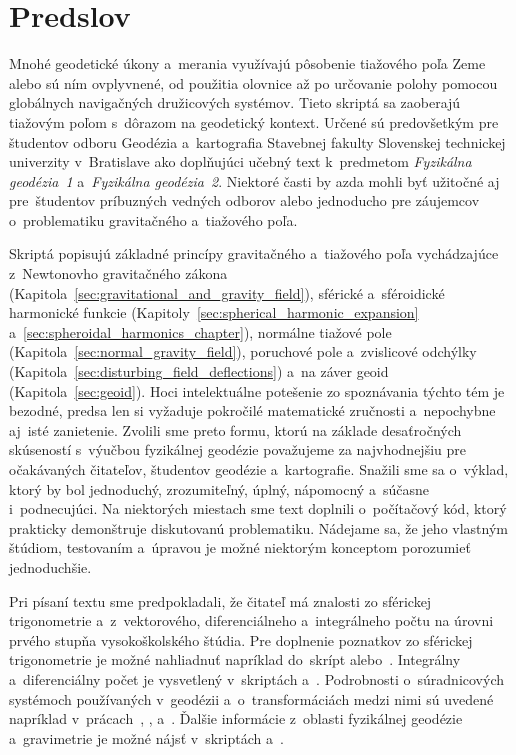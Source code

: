 \documentclass[a4paper, 12pt]{book}
\begin{document}

\chapter*{Predslov}

Mnohé geodetické úkony a~merania využívajú pôsobenie tiažového poľa Zeme alebo 
sú ním ovplyvnené, od použitia olovnice až po určovanie polohy pomocou 
globálnych navigačných družicových systémov.  Tieto skriptá sa zaoberajú 
tiažovým poľom s~dôrazom na geodetický kontext.  Určené sú predovšetkým pre 
študentov odboru Geodézia a~kartografia Stavebnej fakulty Slovenskej technickej 
univerzity v~Bratislave ako doplňujúci učebný text k~predmetom \emph{Fyzikálna 
geodézia~1} a~\emph{Fyzikálna geodézia~2}.  Niektoré časti by azda mohli byť 
užitočné aj pre~študentov príbuzných vedných odborov alebo jednoducho pre 
záujemcov o~problematiku gravitačného a~tiažového poľa.

Skriptá popisujú základné princípy gravitačného a~tiažového poľa vychádzajúce 
z~Newtonovho gravitačného zákona 
(Kapitola~\ref{sec:gravitational_and_gravity_field}), sférické a~sféroidické 
harmonické funkcie (Kapitoly~\ref{sec:spherical_harmonic_expansion} 
a~\ref{sec:spheroidal_harmonics_chapter}), normálne tiažové pole 
(Kapitola~\ref{sec:normal_gravity_field}), poruchové pole a~zvislicové odchýlky 
(Kapitola~\ref{sec:disturbing_field_deflections}) a~na záver geoid 
(Kapitola~\ref{sec:geoid}).  Hoci intelektuálne potešenie zo spoznávania týchto 
tém je bezodné, predsa len si vyžaduje pokročilé matematické zručnosti 
a~nepochybne aj~isté zanietenie.  Zvolili sme preto formu, ktorú na základe 
desaťročných skúseností s~výučbou fyzikálnej geodézie považujeme za 
najvhodnejšiu pre očakávaných čitateľov, študentov geodézie a~kartografie.  
Snažili sme sa o~výklad, ktorý by bol jednoduchý, zrozumiteľný, úplný, 
nápomocný a~súčasne i~podnecujúci.  Na niektorých miestach sme text doplnili 
o~počítačový kód, ktorý prakticky demonštruje diskutovanú problematiku.  
Nádejame sa, že jeho vlastným štúdiom, testovaním a~úpravou je možné niektorým 
konceptom porozumieť jednoduchšie.

Pri písaní textu sme predpokladali, že čitateľ má znalosti zo sférickej 
trigonometrie a~z~vektorového, diferenciálneho a~integrálneho počtu na úrovni 
prvého stupňa vysokoškolského štúdia.  Pre doplnenie poznatkov zo sférickej 
trigonometrie je možné nahliadnuť napríklad do~skrípt \textcite{Husar2017} 
alebo~\textcite{Minarechova2019}.  Integrálny a~diferenciálny počet je 
vysvetlený v~skriptách \textcite{Minarechova2019} a~\textcite{Macak2021}.  
Podrobnosti o~súradnicových systémoch používaných v~geodézii 
a~o~transformáciách medzi nimi sú uvedené napríklad 
v~prácach~\textcite{Melicher1993}, \textcite{Kostelecky2008}, 
\textcite{Melicher2009} a~\textcite{Husar2017}.  Ďalšie informácie z~oblasti 
fyzikálnej geodézie a~gravimetrie je možné nájsť v~skriptách 
\textcite{Janak2006} a~\textcite{Janak2010}.
\end{document}
